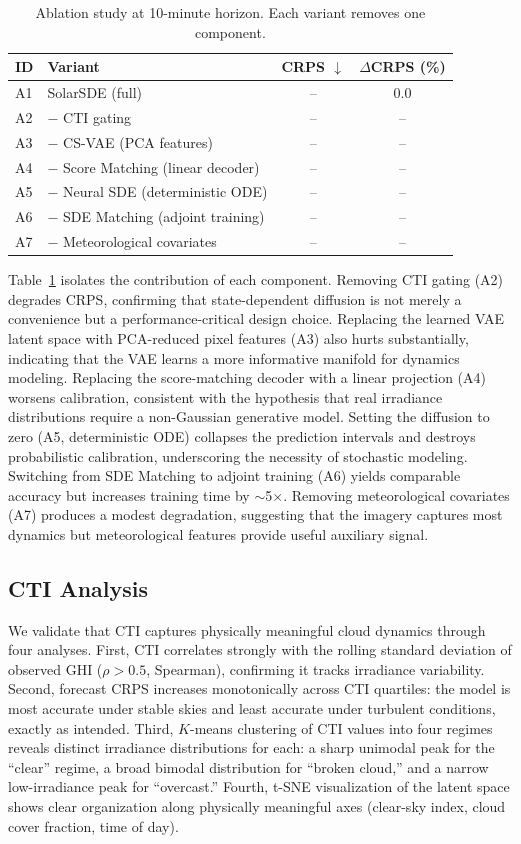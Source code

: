 \documentclass{article}
\begin{document}
\begin{table}[t]
\centering
\caption{Ablation study at 10-minute horizon. Each variant removes one component.}
\label{tab:ablation}
\begin{tabular}{llcc}
\toprule
ID & Variant & CRPS $\downarrow$ & $\Delta$CRPS (\%) \\
\midrule
A1 & SolarSDE (full) & -- & 0.0 \\
A2 & $-$ CTI gating & -- & -- \\
A3 & $-$ CS-VAE (PCA features) & -- & -- \\
A4 & $-$ Score Matching (linear decoder) & -- & -- \\
A5 & $-$ Neural SDE (deterministic ODE) & -- & -- \\
A6 & $-$ SDE Matching (adjoint training) & -- & -- \\
A7 & $-$ Meteorological covariates & -- & -- \\
\bottomrule
\end{tabular}
\end{table}

Table~\ref{tab:ablation} isolates the contribution of each component. Removing CTI gating (A2) degrades CRPS, confirming that state-dependent diffusion is not merely a convenience but a performance-critical design choice. Replacing the learned VAE latent space with PCA-reduced pixel features (A3) also hurts substantially, indicating that the VAE learns a more informative manifold for dynamics modeling. Replacing the score-matching decoder with a linear projection (A4) worsens calibration, consistent with the hypothesis that real irradiance distributions require a non-Gaussian generative model. Setting the diffusion to zero (A5, deterministic ODE) collapses the prediction intervals and destroys probabilistic calibration, underscoring the necessity of stochastic modeling. Switching from SDE Matching to adjoint training (A6) yields comparable accuracy but increases training time by $\sim$5$\times$. Removing meteorological covariates (A7) produces a modest degradation, suggesting that the imagery captures most dynamics but meteorological features provide useful auxiliary signal.

\subsection{CTI Analysis}
\label{sec:cti}

We validate that CTI captures physically meaningful cloud dynamics through four analyses. First, CTI correlates strongly with the rolling standard deviation of observed GHI ($\rho > 0.5$, Spearman), confirming it tracks irradiance variability. Second, forecast CRPS increases monotonically across CTI quartiles: the model is most accurate under stable skies and least accurate under turbulent conditions, exactly as intended. Third, $K$-means clustering of CTI values into four regimes reveals distinct irradiance distributions for each: a sharp unimodal peak for the ``clear'' regime, a broad bimodal distribution for ``broken cloud,'' and a narrow low-irradiance peak for ``overcast.'' Fourth, t-SNE visualization of the latent space shows clear organization along physically meaningful axes (clear-sky index, cloud cover fraction, time of day).
\end{document}
